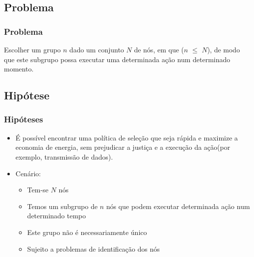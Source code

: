 \documentclass{beamer}
\begin{document}
\subsection{Problema}
\begin{frame}
    \frametitle{Problema}
    Escolher um grupo $n$ dado um conjunto $N$ de nós, em que ($n$ $\leqslant$
    $N$), de modo que este subgrupo possa executar uma determinada ação num determinado momento.
\end{frame}


\subsection{Hipótese}
\begin{frame}
    \frametitle{Hipóteses}
    \begin{itemize}
      \item É possível encontrar uma política de seleção que seja rápida e
      maximize a economia de energia, sem prejudicar a justiça e a execução da
      ação(por exemplo, transmissão de dados).
      \item Cenário:
        \begin{itemize}
            \item Tem-se $N$ nós
            \item Temos um subgrupo de $n$ nós que podem executar determinada
            ação num determinado tempo
            \item Este grupo não é necessariamente único
            \item Sujeito a problemas de identificação dos nós
        \end{itemize} 
    \end{itemize}
\end{frame}
\end{document}
